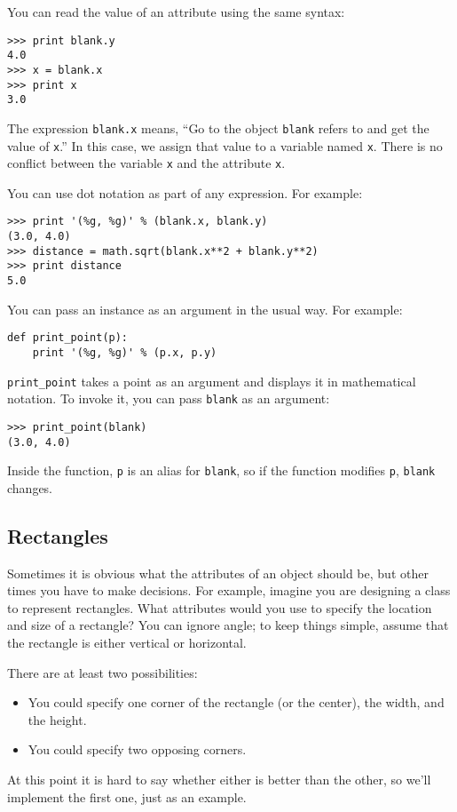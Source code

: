 \documentclass{article}
\begin{document}
You can read the value of an attribute using the same syntax:
\begin{verbatim}
>>> print blank.y
4.0
>>> x = blank.x
>>> print x
3.0
\end{verbatim}
The expression \verb|blank.x| means, ``Go to the object \verb|blank| refers
to and get the value of \verb|x|.'' In this case, we assign that value to a
variable named \verb|x|.  There is no conflict between the variable
\verb|x| and the attribute \verb|x|.

You can use dot notation as part of any expression. For example:
\begin{verbatim}
>>> print '(%g, %g)' % (blank.x, blank.y)
(3.0, 4.0)
>>> distance = math.sqrt(blank.x**2 + blank.y**2)
>>> print distance
5.0
\end{verbatim}
You can pass an instance as an argument in the usual way. For example:
\begin{verbatim}
def print_point(p):
    print '(%g, %g)' % (p.x, p.y)
\end{verbatim}
\verb|print_point| takes a point as an argument and displays it in
mathematical notation. To invoke it, you can pass \verb|blank| as an
argument:
\begin{verbatim}
>>> print_point(blank)
(3.0, 4.0)
\end{verbatim}
Inside the function, \verb|p| is an alias for \verb|blank|, so if the
function modifies \verb|p|, \verb|blank| changes.
\subsection{Rectangles}
Sometimes it is obvious what the attributes of an object should be, but
other times you have to make decisions. For example, imagine you are
designing a class to represent rectangles. What attributes would you use to
specify the location and size of a rectangle? You can ignore angle; to keep
things simple, assume that the rectangle is either vertical or horizontal.

There are at least two possibilities:
\begin{itemize}
    \item You could specify one corner of the rectangle (or the center),
        the width, and the height.
    \item You could specify two opposing corners.
\end{itemize}
At this point it is hard to say whether either is better than the other, so
we’ll implement the first one, just as an example.
\end{document}
